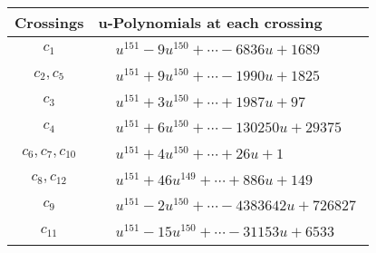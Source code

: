 \documentclass[1p]{elsarticle_modified}
\theoremstyle{definition}
\begin{document}
\begin{tabular}{m{50pt}|m{274pt}}
Crossings & \hspace{64pt}u-Polynomials at each crossing \\
\hline $$\begin{aligned}c_{1}\end{aligned}$$&$\begin{aligned}
&u^{151}-9 u^{150}+\cdots-6836 u+1689
\end{aligned}$\\
\hline $$\begin{aligned}c_{2},c_{5}\end{aligned}$$&$\begin{aligned}
&u^{151}+9 u^{150}+\cdots-1990 u+1825
\end{aligned}$\\
\hline $$\begin{aligned}c_{3}\end{aligned}$$&$\begin{aligned}
&u^{151}+3 u^{150}+\cdots+1987 u+97
\end{aligned}$\\
\hline $$\begin{aligned}c_{4}\end{aligned}$$&$\begin{aligned}
&u^{151}+6 u^{150}+\cdots-130250 u+29375
\end{aligned}$\\
\hline $$\begin{aligned}c_{6},c_{7},c_{10}\end{aligned}$$&$\begin{aligned}
&u^{151}+4 u^{150}+\cdots+26 u+1
\end{aligned}$\\
\hline $$\begin{aligned}c_{8},c_{12}\end{aligned}$$&$\begin{aligned}
&u^{151}+46 u^{149}+\cdots+886 u+149
\end{aligned}$\\
\hline $$\begin{aligned}c_{9}\end{aligned}$$&$\begin{aligned}
&u^{151}-2 u^{150}+\cdots-4383642 u+726827
\end{aligned}$\\
\hline $$\begin{aligned}c_{11}\end{aligned}$$&$\begin{aligned}
&u^{151}-15 u^{150}+\cdots-31153 u+6533
\end{aligned}$\\
\hline
\end{tabular}\\~\\
\end{document}
